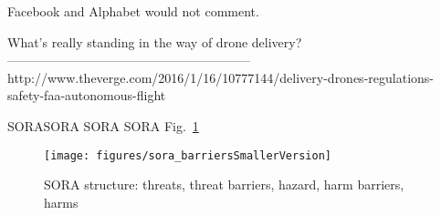 Facebook and Alphabet would not comment.

What's really standing in the way of drone delivery?
---------------------------------------------------------
http://www.theverge.com/2016/1/16/10777144/delivery-drones-regulations-safety-faa-autonomous-flight


 SORASORA SORA SORA Fig.~\ref{fig:sora_barriersSmallerVersion}
\begin{figure}
\begin{center}
\texttt{[image: figures/sora\_barriersSmallerVersion]}    %
\caption{SORA structure: threats, threat barriers, hazard, harm barriers, harms} 
\label{fig:sora_barriersSmallerVersion}
\end{center}
\end{figure}

